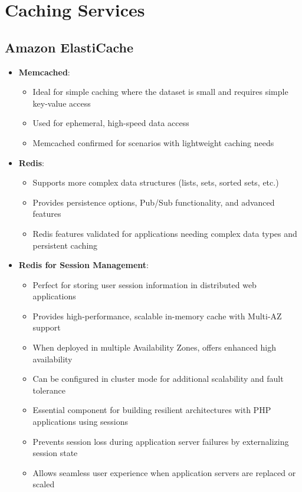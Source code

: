 \documentclass[11pt,a4paper]{report}
\begin{document}
\chapter{Caching Services}



\section{Amazon ElastiCache}

\begin{itemize}
  \item \textbf{Memcached}:
\begin{itemize}
  \item Ideal for simple caching where the dataset is small and requires simple key-value access
  \item Used for ephemeral, high-speed data access
  \item Memcached confirmed for scenarios with lightweight caching needs
\end{itemize}
  \item \textbf{Redis}:
\begin{itemize}
  \item Supports more complex data structures (lists, sets, sorted sets, etc.)
  \item Provides persistence options, Pub/Sub functionality, and advanced features
  \item Redis features validated for applications needing complex data types and persistent caching
\end{itemize}
  \item \textbf{Redis for Session Management}:
\begin{itemize}
  \item Perfect for storing user session information in distributed web applications
  \item Provides high-performance, scalable in-memory cache with Multi-AZ support
  \item When deployed in multiple Availability Zones, offers enhanced high availability
  \item Can be configured in cluster mode for additional scalability and fault tolerance
  \item Essential component for building resilient architectures with PHP applications using sessions
  \item Prevents session loss during application server failures by externalizing session state
  \item Allows seamless user experience when application servers are replaced or scaled

\end{itemize}
\end{itemize}
\end{document}
